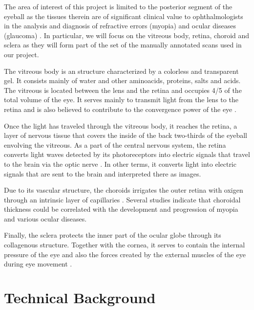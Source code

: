 \documentclass[12pt,a4paper]{scrartcl}
\begin{document}
The area of interest of this project is limited to the posterior segment of the eyeball as the tissues therein are of significant clinical value to ophthalmologists in the analysis and diagnosis of refractive errors (myopia) and ocular diseases (glaucoma) \cite{Ronchetti2017}. In particular, we will focus on the vitreous body, retina, choroid and sclera as they will form part of the set of the manually annotated scans used in our project. 

The vitreous body is an structure characterized by a colorless and transparent gel. It consists mainly of water and other aminoacids, proteins, salts and acids. The vitreous is located between the lens and the retina and occupies 4/5 of the total volume of the eye. It serves mainly to transmit light from the lens to the retina and is also believed to contribute to the convergence power of the eye \cite{snell1998}. 

Once the light has traveled through the vitreous body, it reaches the retina, a layer of nervous tissue that covers the inside of the back two-thirds of the eyeball envolving the vitreous. As a part of the central nervous system, the retina converts light waves detected by its photoreceptors into electric signals that travel to the brain via the optic nerve \cite{purves2001}. In other terms, it converts light into electric signals that are sent to the brain and interpreted there as images.

Due to its vascular structure, the choroid\textquotesingle s irrigates the outer retina with oxigen through an intrinsic layer of capillaries   \cite{snell1998, choroidExpl}. Several studies \cite{Ronchetti2019, Ronchetti2018} indicate that choroidal thickness could be correlated with the development and progression of myopia and various ocular diseases. 

Finally, the sclera protects the inner part of the ocular globe through its collagenous structure. Together with the cornea, it serves to contain the internal pressure of the eye and also the forces created by the external muscles of the eye during eye movement \cite{Meek2008}.

\section{Technical Background}\label{s:TechBack}
\end{document}
